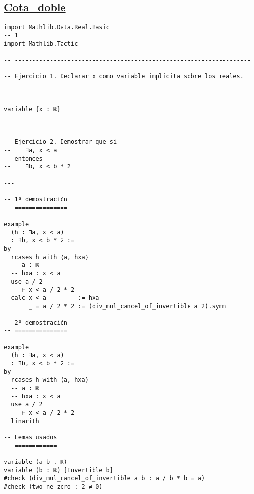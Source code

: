 \subsection{\href{./src/Logica/Cota\_doble.lean}{Cota\_doble}}
\label{sec:orgc003545}
\begin{verbatim}
import Mathlib.Data.Real.Basic                                               -- 1
import Mathlib.Tactic

-- ---------------------------------------------------------------------
-- Ejercicio 1. Declarar x como variable implícita sobre los reales.
-- ----------------------------------------------------------------------

variable {x : ℝ}

-- ---------------------------------------------------------------------
-- Ejercicio 2. Demostrar que si
--    ∃a, x < a
-- entonces
--    ∃b, x < b * 2
-- ----------------------------------------------------------------------

-- 1ª demostración
-- ===============

example
  (h : ∃a, x < a)
  : ∃b, x < b * 2 :=
by
  rcases h with ⟨a, hxa⟩
  -- a : ℝ
  -- hxa : x < a
  use a / 2
  -- ⊢ x < a / 2 * 2
  calc x < a         := hxa
       _ = a / 2 * 2 := (div_mul_cancel_of_invertible a 2).symm

-- 2ª demostración
-- ===============

example
  (h : ∃a, x < a)
  : ∃b, x < b * 2 :=
by
  rcases h with ⟨a, hxa⟩
  -- a : ℝ
  -- hxa : x < a
  use a / 2
  -- ⊢ x < a / 2 * 2
  linarith

-- Lemas usados
-- ============

variable (a b : ℝ)
variable (b : ℝ) [Invertible b]
#check (div_mul_cancel_of_invertible a b : a / b * b = a)
#check (two_ne_zero : 2 ≠ 0)
\end{verbatim}

